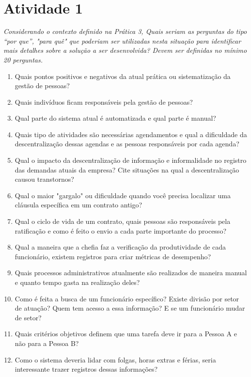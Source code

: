 \documentclass[12pt,a4paper]{article}
\begin{document}



\section*{Atividade 1}
\textit{Considerando o contexto definido na Prática 3, Quais seriam as perguntas do tipo “por que”, "para quê" que poderiam ser utilizadas nesta situação para identificar mais detalhes sobre a solução a ser desenvolvida? Devem ser definidas no mínimo 20 perguntas.}

\begin{enumerate}
    \item Quais pontos positivos e negativos da atual prática ou sistematização da gestão de pessoas?
    \item Quais indivíduos ficam responsáveis pela gestão de pessoas?
    \item Qual parte do sistema atual é automatizada e qual parte é manual?
    \item Quais tipo de atividades são necessárias agendamentos e qual a dificuldade da descentralização dessas agendas e as pessoas responsáveis por cada agenda?
    \item Qual o impacto da descentralização de informação e informalidade no registro das demandas atuais da empresa? Cite situações na qual a descentralização causou transtornos?
    \item Qual o maior "gargalo" ou dificuldade quando você precisa localizar uma cláusula específica em um contrato antigo? 
    \item Qual o ciclo de vida de um contrato, quais pessoas são responsáveis pela ratificação e como é feito o envio a cada parte importante do processo?
    \item Qual a maneira que a chefia faz a verificação da produtividade de cada funcionário, existem registros para criar métricas de desempenho?
    \item Quais processos administrativos atualmente são realizados de maneira manual e quanto tempo gasta na realização deles?
    \item Como é feita a busca de um funcionário específico? Existe divisão por setor de atuação? Quem tem acesso a essa informação? E se um funcionário mudar de setor?
    \item Quais critérios objetivos definem que uma tarefa deve ir para a Pessoa A e não para a Pessoa B? 
    \item Como o sistema deveria lidar com folgas, horas extras e férias, seria interessante trazer registros dessas informações?

\end{enumerate}
\end{document}
